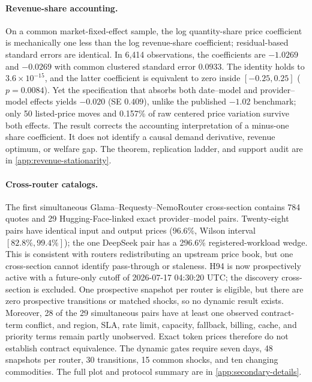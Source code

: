 \documentclass[11pt]{article}
\newcommand{\1}{\mathbf{1}}
\begin{document}
\paragraph{Revenue-share accounting.}
On a common market-fixed-effect sample, the log quantity-share price coefficient
is mechanically one less than the log revenue-share coefficient; residual-based
standard errors are identical.  In 6,414 observations, the coefficients are
$-1.0269$ and $-0.0269$ with common clustered standard error $0.0933$.  The
identity holds to $3.6\times10^{-15}$, and the latter coefficient is equivalent
to zero inside $[-0.25,0.25]$ ($p=0.0084$).  Yet the specification that absorbs
both date--model and provider--model effects yields $-0.020$ (SE $0.409$), unlike
the published $-1.02$ benchmark; only 50 listed-price moves and 0.157\% of raw
centered price variation survive both effects.  The result corrects the accounting
interpretation of a minus-one share coefficient.  It does not identify a causal
demand derivative, revenue optimum, or welfare gap.  The theorem, replication
ladder, and support audit are in \cref{app:revenue-stationarity}.

\paragraph{Cross-router catalogs.}
The first simultaneous Glama--Requesty--NemoRouter cross-section contains 784
quotes and 29 Hugging-Face-linked exact provider--model pairs.  Twenty-eight pairs
have identical input and output prices (96.6\%, Wilson interval
$[82.8\%,99.4\%]$); the one DeepSeek pair has a 296.6\% registered-workload wedge.
This is consistent with routers redistributing an upstream price book, but one
cross-section cannot identify pass-through or staleness.  H94 is now prospectively
active with a future-only cutoff of 2026-07-17 04:30:20 UTC; the discovery
cross-section is excluded.  One prospective snapshot per router is eligible, but
there are zero prospective transitions or matched shocks, so no dynamic result
exists.  Moreover, 28 of the 29 simultaneous pairs have at least one observed
contract-term conflict, and region, SLA, rate limit, capacity, fallback, billing,
cache, and priority terms remain partly unobserved.  Exact token prices therefore
do not establish contract equivalence.  The dynamic gates
require seven days, 48 snapshots per router, 30 transitions, 15 common shocks,
and ten changing commodities.  The full plot and protocol summary are in
\cref{app:secondary-details}.
\end{document}
